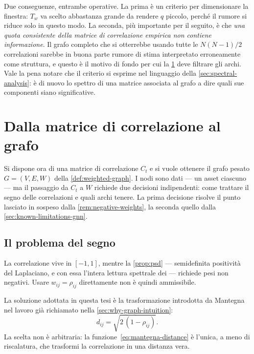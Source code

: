 Due conseguenze, entrambe operative. La prima è un criterio per dimensionare la finestra: $T_w$ va scelto abbastanza grande da rendere $q$ piccolo, perché il rumore si riduce solo in questo modo. La seconda, più importante per il seguito, è che \emph{una quota consistente della matrice di correlazione empirica non contiene informazione}. Il grafo completo che si otterrebbe usando tutte le $N(N-1)/2$ correlazioni sarebbe in buona parte rumore di stima interpretato erroneamente come struttura, e questo è il motivo di fondo per cui la \cref{sec:correlation-matrix-to-graph} deve filtrare gli archi. Vale la pena notare che il criterio si esprime nel linguaggio della \cref{sec:spectral-analysis}: è di nuovo lo spettro di una matrice associata al grafo a dire quali sue componenti siano significative.

\section{Dalla matrice di correlazione al grafo}
\label{sec:correlation-matrix-to-graph}

Si dispone ora di una matrice di correlazione $C_t$ e si vuole ottenere il grafo pesato $G=(V,E,W)$ della \cref{def:weighted-graph}. I nodi sono dati — un asset ciascuno — ma il passaggio da $C_t$ a $W$ richiede due decisioni indipendenti: come trattare il segno delle correlazioni e quali archi tenere. La prima decisione risolve il punto lasciato in sospeso dalla \cref{rem:negative-weights}, la seconda quello dalla \cref{sec:known-limitations-gnn}.

\subsection{Il problema del segno}

La correlazione vive in $[-1,1]$, mentre la \cref{prop:psd} — semidefinita positività del Laplaciano, e con essa l'intera lettura spettrale dei  — richiede pesi non negativi. Usare $w_{ij}=\rho_{ij}$ direttamente non è quindi ammissibile.

La soluzione adottata in questa tesi è la trasformazione introdotta da Mantegna~\cite{mantegna1999hierarchical} nel lavoro già richiamato nella \cref{sec:why-graph-intuition}:
\begin{equation}
\label{eq:mantegna-distance}
d_{ij} = \sqrt{2\,(1-\rho_{ij})}.
\end{equation}
La scelta non è arbitraria: la funzione~\eqref{eq:mantegna-distance} è l'unica, a meno di riscalatura, che trasformi la correlazione in una distanza vera.

